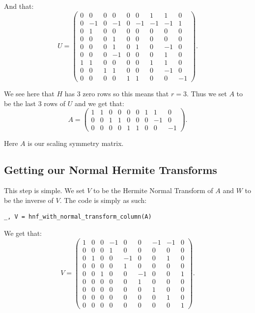 \documentclass[oneside, a4paper, onecolumn, 11pt]{article}
\begin{document}
And that:
\[
    U = \begin{pmatrix}
        0 & 0  & 0 & 0  & 0 & 0  & 1  & 1  & 0  \\
        0 & -1 & 0 & -1 & 0 & -1 & -1 & -1 & 1  \\
        0 & 1  & 0 & 0  & 0 & 0  & 0  & 0  & 0  \\
        0 & 0  & 0 & 1  & 0 & 0  & 0  & 0  & 0  \\
        0 & 0  & 0 & 1  & 0 & 1  & 0  & -1 & 0  \\
        0 & 0  & 0 & -1 & 0 & 0  & 0  & 1  & 0  \\
        1 & 1  & 0 & 0  & 0 & 0  & 1  & 1  & 0  \\
        0 & 0  & 1 & 1  & 0 & 0  & 0  & -1 & 0  \\
        0 & 0  & 0 & 0  & 1 & 1  & 0  & 0  & -1
    \end{pmatrix}.
\]

We see here that \(H\) has \(3\) zero rows so this means that \(r = 3\). Thus we set \(A\) to be the last \(3\) rows of \(U\) and we get that:
\[
    A = \begin{pmatrix}
        1 & 1 & 0 & 0 & 0 & 0 & 1 & 1  & 0  \\
        0 & 0 & 1 & 1 & 0 & 0 & 0 & -1 & 0  \\
        0 & 0 & 0 & 0 & 1 & 1 & 0 & 0  & -1
    \end{pmatrix}.
\]

Here \(A\) is our scaling symmetry matrix.

\subsection{Getting our Normal Hermite Transforms}

This step is simple. We set \(V\) to be the Hermite Normal Transform of \(A\) and \(W\) to be the inverse of \(V\). The code is simply as such:
\begin{lstlisting}
_, V = hnf_with_normal_transform_column(A)
\end{lstlisting}

We get that:
\[
    V = \begin{pmatrix}
        1 & 0 & 0 & -1 & 0  & 0  & -1 & -1 & 0 \\
        0 & 0 & 0 & 1  & 0  & 0  & 0  & 0  & 0 \\
        0 & 1 & 0 & 0  & -1 & 0  & 0  & 1  & 0 \\
        0 & 0 & 0 & 0  & 1  & 0  & 0  & 0  & 0 \\
        0 & 0 & 1 & 0  & 0  & -1 & 0  & 0  & 1 \\
        0 & 0 & 0 & 0  & 0  & 1  & 0  & 0  & 0 \\
        0 & 0 & 0 & 0  & 0  & 0  & 1  & 0  & 0 \\
        0 & 0 & 0 & 0  & 0  & 0  & 0  & 1  & 0 \\
        0 & 0 & 0 & 0  & 0  & 0  & 0  & 0  & 1
    \end{pmatrix}.
\]
\end{document}
